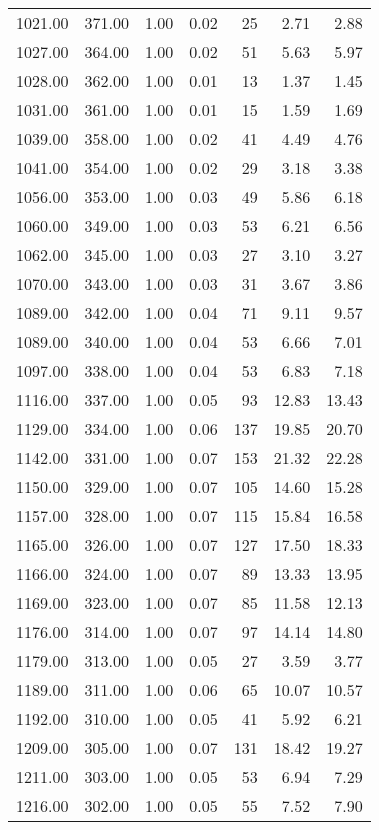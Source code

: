 \begin{table}
\begin{tabular}{rrrrrrr}
1021.00 & 371.00 & 1.00 & 0.02 & 25 & 2.71 & 2.88 \\
1027.00 & 364.00 & 1.00 & 0.02 & 51 & 5.63 & 5.97 \\
1028.00 & 362.00 & 1.00 & 0.01 & 13 & 1.37 & 1.45 \\
1031.00 & 361.00 & 1.00 & 0.01 & 15 & 1.59 & 1.69 \\
1039.00 & 358.00 & 1.00 & 0.02 & 41 & 4.49 & 4.76 \\
1041.00 & 354.00 & 1.00 & 0.02 & 29 & 3.18 & 3.38 \\
1056.00 & 353.00 & 1.00 & 0.03 & 49 & 5.86 & 6.18 \\
1060.00 & 349.00 & 1.00 & 0.03 & 53 & 6.21 & 6.56 \\
1062.00 & 345.00 & 1.00 & 0.03 & 27 & 3.10 & 3.27 \\
1070.00 & 343.00 & 1.00 & 0.03 & 31 & 3.67 & 3.86 \\
1089.00 & 342.00 & 1.00 & 0.04 & 71 & 9.11 & 9.57 \\
1089.00 & 340.00 & 1.00 & 0.04 & 53 & 6.66 & 7.01 \\
1097.00 & 338.00 & 1.00 & 0.04 & 53 & 6.83 & 7.18 \\
1116.00 & 337.00 & 1.00 & 0.05 & 93 & 12.83 & 13.43 \\
1129.00 & 334.00 & 1.00 & 0.06 & 137 & 19.85 & 20.70 \\
1142.00 & 331.00 & 1.00 & 0.07 & 153 & 21.32 & 22.28 \\
1150.00 & 329.00 & 1.00 & 0.07 & 105 & 14.60 & 15.28 \\
1157.00 & 328.00 & 1.00 & 0.07 & 115 & 15.84 & 16.58 \\
1165.00 & 326.00 & 1.00 & 0.07 & 127 & 17.50 & 18.33 \\
1166.00 & 324.00 & 1.00 & 0.07 & 89 & 13.33 & 13.95 \\
1169.00 & 323.00 & 1.00 & 0.07 & 85 & 11.58 & 12.13 \\
1176.00 & 314.00 & 1.00 & 0.07 & 97 & 14.14 & 14.80 \\
1179.00 & 313.00 & 1.00 & 0.05 & 27 & 3.59 & 3.77 \\
1189.00 & 311.00 & 1.00 & 0.06 & 65 & 10.07 & 10.57 \\
1192.00 & 310.00 & 1.00 & 0.05 & 41 & 5.92 & 6.21 \\
1209.00 & 305.00 & 1.00 & 0.07 & 131 & 18.42 & 19.27 \\
1211.00 & 303.00 & 1.00 & 0.05 & 53 & 6.94 & 7.29 \\
1216.00 & 302.00 & 1.00 & 0.05 & 55 & 7.52 & 7.90 \\

\end{tabular}
\end{table}
